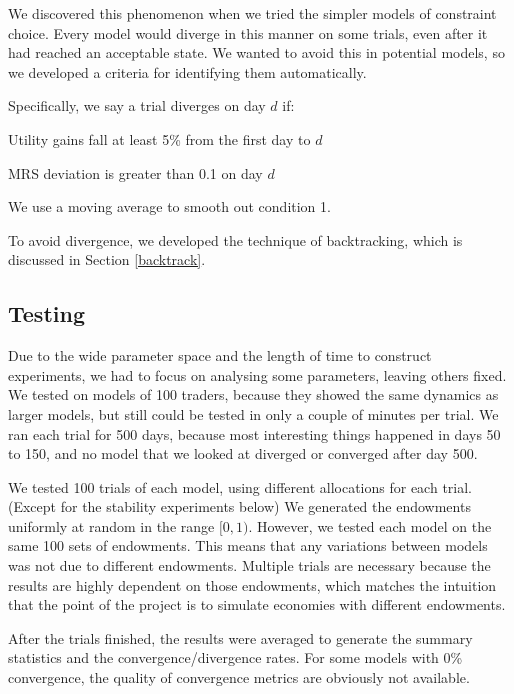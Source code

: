 \documentclass[12pt,a4paper,titlepage]{article}
\begin{document}

We discovered this phenomenon when we tried the simpler models of constraint choice.
Every model would diverge in this manner on some trials, even after it had reached an acceptable state.
We wanted to avoid this in potential models, so we developed a criteria for identifying them automatically.

Specifically, we say a trial diverges on day $d$ if:
\begin{description}[align=right,labelwidth=2cm,font=\normalfont]
\item[1.] Utility gains fall at least 5\% from the first day to $d$ 
\item[AND 2.] MRS deviation is greater than 0.1 on day $d$
\end{description}
We use a moving average to smooth out condition 1.
    
To avoid divergence, we developed the technique of backtracking, which is discussed in Section \ref{backtrack}.

\subsection{Testing}
Due to the wide parameter space and the length of time to construct experiments, we had to focus on analysing some parameters, leaving others fixed.
We tested on models of 100 traders, because they showed the same dynamics as larger models, but still could be tested in only a couple of minutes per trial.
We ran each trial for 500 days, because most interesting things happened in days 50 to 150, and no model that we looked at diverged or converged after day 500.

We tested 100 trials of each model, using different allocations for each trial.
(Except for the stability experiments below)
We generated the endowments uniformly at random in the range $[0, 1)$.
However, we tested each model on the same 100 sets of endowments.
This means that any variations between models was not due to different endowments.
Multiple trials are necessary because the results are highly dependent on those endowments, which matches the intuition that the point of the project is to simulate economies with different endowments.
    
After the trials finished, the results were averaged to generate the summary statistics and the convergence/divergence rates.
For some models with 0\% convergence, the quality of convergence metrics are obviously not available.
\end{document}

